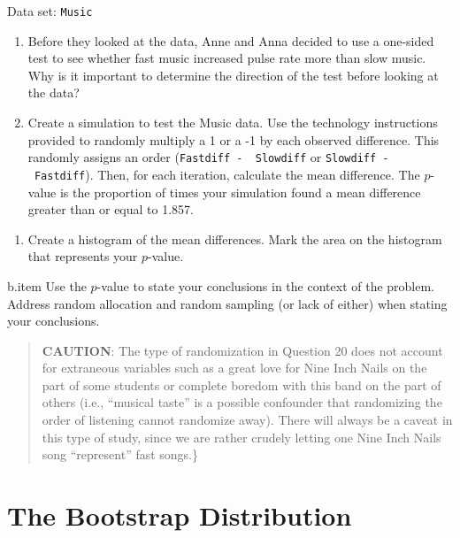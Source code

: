 \documentclass[
]{report}
\providecommand{\tightlist}{%
  \setlength{\itemsep}{0pt}\setlength{\parskip}{0pt}}
\begin{document}
Data set: \texttt{Music}

\begin{enumerate}
\def\labelenumi{\arabic{enumi}.}
\setcounter{enumi}{18}
\item
  Before they looked at the data, Anne and Anna decided to use a one-sided test to see whether fast music increased pulse rate more than slow music. Why is it important to determine the direction of the test before looking at the data?
\item
  Create a simulation to test the Music data. Use the technology instructions provided to randomly multiply a 1 or a -1 by each observed difference. This randomly assigns an order (\texttt{Fastdiff\ -\ \ Slowdiff} or \texttt{Slowdiff\ -\ Fastdiff}). Then, for each iteration, calculate the mean difference. The \(p\)-value is the proportion of times your simulation found a mean difference greater than or equal to 1.857.
\end{enumerate}

\begin{enumerate}
\def\labelenumi{\alph{enumi}.}
\tightlist
\item
  Create a histogram of the mean differences. Mark the area on the histogram that represents your \(p\)-value.
\end{enumerate}

b.item Use the \(p\)-value to state your conclusions in the context of the problem. Address random allocation and random sampling (or lack of either) when stating your conclusions.

\begin{quote}
\textbf{CAUTION}: The type of randomization in Question 20 does not account for extraneous variables such as a great love for Nine Inch Nails on the part of some students or complete boredom with this band on the part of others (i.e., ``musical taste'' is a possible confounder that randomizing the order of listening cannot randomize away). There will always be a caveat in this type of study, since we are rather crudely letting one Nine Inch Nails song ``represent'' fast songs.\}
\end{quote}

\hypertarget{the-bootstrap-distribution}{%
\section{\texorpdfstring{\textbf{The Bootstrap Distribution}}{The Bootstrap Distribution}}\label{the-bootstrap-distribution}}
\end{document}
